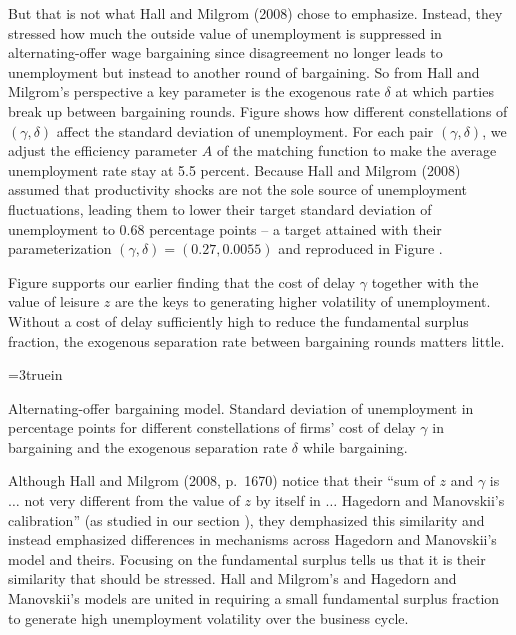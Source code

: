 But that is not what
Hall and Milgrom (2008) chose to emphasize. Instead, they stressed how much the
outside value of unemployment is suppressed in alternating-offer
wage bargaining since disagreement no longer leads to
unemployment but instead to another round of bargaining. So from Hall and Milgrom's perspective
a key parameter
is the exogenous rate $\delta$ at which parties break up
between bargaining rounds. Figure  shows
how different constellations of $(\gamma, \delta)$ affect the
standard deviation of unemployment.  %
For each pair $(\gamma,\delta)$, we adjust the efficiency
parameter $A$ of the matching function to make the average
unemployment rate stay at 5.5 percent. Because
Hall and Milgrom (2008) assumed that productivity shocks are not
the sole source of unemployment fluctuations, leading them to lower their target  standard deviation
of unemployment to 0.68 percentage points -- a target
attained with their parameterization
$(\gamma, \delta)=(0.27, 0.0055)$
and reproduced in Figure .

Figure  supports our earlier finding
that the cost of delay $\gamma$ together with the value of
leisure $z$ are the keys to  generating higher volatility
of unemployment. Without a cost of delay sufficiently high
to reduce the fundamental surplus fraction, the exogenous separation rate between
bargaining rounds  matters little.

\centerline{\epsfxsize=3truein}
\caption{Alternating-offer bargaining model. Standard deviation of unemployment in percentage
points for different constellations of firms' cost of delay
$\gamma$ in bargaining  and the exogenous separation rate
$\delta$ while bargaining.}
\endfigure

Although Hall and Milgrom (2008, p.~1670) notice that their ``sum
of $z$ and $\gamma$ is $\ldots$ not very different from the value
of $z$ by itself in $\ldots$ Hagedorn and Manovskii's
calibration'' (as studied in our section ),
they demphasized this  similarity and instead emphasized
  differences in mechanisms across Hagedorn and Manovskii's model and theirs.
Focusing on the  fundamental surplus tells us that it is
their similarity that should
be stressed.   Hall and Milgrom's and Hagedorn and Manovskii's  models are united in requiring a small fundamental
surplus fraction  to generate high unemployment volatility
over the business cycle.


